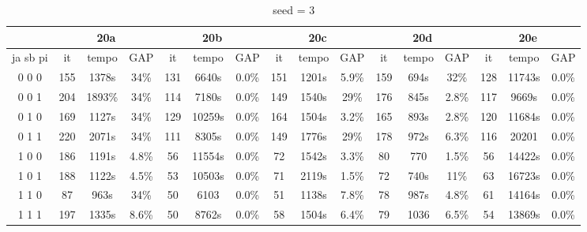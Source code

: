 \documentclass[12pt]{article}
\begin{document}
\begin{table}[!htb]
\centering
\footnotesize
\begin{tabular}{|c||c|c|c||c|c|c||c|c|c||c|c|c||c|c|c|}
\cline{2-16}
\multicolumn{1}{c||}{} & \multicolumn{3}{c||}{20a} & \multicolumn{3}{c||}{20b} & \multicolumn{3}{c||}{20c} & \multicolumn{3}{c||}{20d} & \multicolumn{3}{c|}{20e}\\
\hline
ja sb pi & it & tempo & GAP & it & tempo & GAP & it & tempo & GAP & it & tempo & GAP & it & tempo & GAP \\
\hline
0 0 0 & 155 & 1378s & 34\% & 131 & 6640s & 0.0\% & 151 & 1201s & 5.9\% & 159 & 694s & 32\% & 128 & 11743s & 0.0\% \\
0 0 1 & 204 & 1893\% & 34\% & 114 & 7180s & 0.0\% & 149 & 1540s & 29\% & 176 & 845s & 2.8\% & 117 & 9669s & 0.0\% \\
0 1 0 & 169 & 1127s & 34\% & 129 & 10259s & 0.0\% & 164 & 1504s & 3.2\% & 165 & 893s & 2.8\% & 120 & 11684s & 0.0\% \\
0 1 1 & 220 & 2071s & 34\% & 111 & 8305s & 0.0\% & 149 & 1776s & 29\% & 178 & 972s & 6.3\% & 116 & 20201 & 0.0\% \\
1 0 0 & 186 & 1191s & 4.8\% & 56 & 11554s & 0.0\% & 72 & 1542s & 3.3\% & 80 & 770 & 1.5\% & 56 & 14422s & 0.0\% \\
1 0 1 & 188 & 1122s & 4.5\% & 53 & 10503s & 0.0\% & 71 & 2119s & 1.5\% & 72 & 740s & 11\% & 63 & 16723s & 0.0\% \\
1 1 0 & 87 & 963s & 34\% & 50 & 6103 & 0.0\% & 51 & 1138s & 7.8\% & 78 & 987s & 4.8\% & 61 & 14164s & 0.0\% \\
1 1 1 & 197 & 1335s & 8.6\% & 50 & 8762s & 0.0\% & 58 & 1504s & 6.4\% & 79 & 1036 & 6.5\% & 54 & 13869s & 0.0\% \\
\hline
\end{tabular}
\caption{seed = 3}
\end{table}
\end{document}
